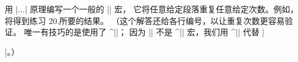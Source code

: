 {{{{{{{{{{%
\ddangerexercise 用 |\loop...\repeat| 原理编写一个一般的 |\punishment| 宏，
它将任意给定段落重复任意给定次数。例如，
\begintt
{}
\endtt
将得到练习 20.\punishexno 所要的结果。
\answer （这个解答还给各行编号，以让重复次数更容易验证。
唯一有技巧的是使用了 ^|\endgraf|；
因为 |\loop| 不是 ^|\long| 宏，我们用 ^|\endgraf| 代替 |\par|。）
\begintt
\newcount\n
\def\punishment#1#2{\n=0
  \loop\ifnum\n<#2 \advance\n by1
    \item{\number\n.}#1\endgraf\repeat}
\endtt

}}}}}}}}}}

